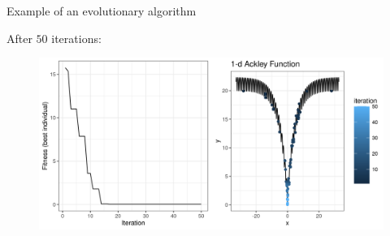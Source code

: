 \documentclass[11pt,compress,t,notes=noshow, xcolor=table]{beamer}
\begin{document}
\begin{vbframe}{Example of an evolutionary algorithm}

After $50$ iterations: 

\vspace{0.5cm}

\begin{center}
\begin{figure}
  \includegraphics[width=1\textwidth]{figure_man/1dim-ackley-func-final.png}
\end{figure}
\end{center}


\end{vbframe}


\endlecture
\end{document}
